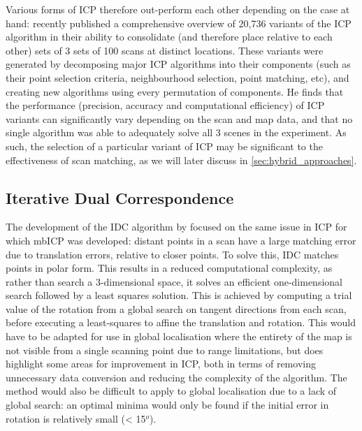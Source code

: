 \documentclass[authoryearcitations]{UoYCSproject}
\begin{document}
Various forms of ICP therefore out-perform each other depending on the case at hand: \citet{Donoso2017-wp} recently published a comprehensive overview of 20,736 variants of the ICP algorithm in their ability to consolidate (and therefore place relative to each other) sets of 3 sets of 100 scans at distinct locations. These variants were generated by decomposing major ICP algorithms into their components (such as their point selection criteria, neighbourhood selection, point matching, etc), and creating new algorithms using every permutation of components. He finds that the performance (precision, accuracy and computational efficiency) of ICP variants can significantly vary depending on the scan and map data, and that no single algorithm was able to adequately solve all 3 scenes in the experiment. As such, the selection of a particular variant of ICP may be significant to the effectiveness of scan matching, as we will later discuss in \ref{sec:hybrid_approaches}.


\subsection{Iterative Dual Correspondence}

The development of the IDC algorithm by \citet{Lu1997-zv} focused on the same issue in ICP for which mbICP was developed: distant points in a scan have a large matching error due to translation errors, relative to closer points. To solve this, IDC matches points in polar form. This results in a reduced computational complexity, as rather than search a 3-dimensional space, it solves an efficient one-dimensional search followed by a least squares solution. This is achieved by computing a trial value of the rotation from a global search on tangent directions from each scan, before executing a least-squares to affine the translation and rotation. This would have to be adapted for use in global localisation where the entirety of the map is not visible from a single scanning point due to range limitations, but does highlight some areas for improvement in ICP, both in terms of removing unnecessary data conversion and reducing the complexity of the algorithm. The method would also be difficult to apply to global localisation due to a lack of global search: an optimal minima would only be found if the initial error in rotation is relatively small (< 15$^o$).
\end{document}
